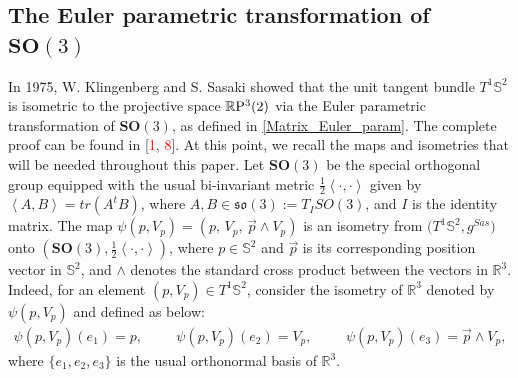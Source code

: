\documentclass[reqno,11pt]{amsart}
\begin{document}




\subsection{The Euler parametric transformation of $\mathbf{SO}(3)$}\label{subsec:Euler}
In 1975, W. Klingenberg and S. Sasaki showed that the unit tangent bundle $T^1\mathbb{S}^2$ is isometric to the projective space $\mathbb{R}\rm{P}^3(2)$ via the Euler parametric transformation of $\mathbf{SO}(3)$, as defined in \eqref{Matrix_Euler_param}. The complete proof can be found in [\textcolor{red}{1}, \textcolor{red}{8}].
At this point, we recall the maps and isometries that will be needed throughout this paper. Let $\mathbf{SO}(3)$ be the special orthogonal group equipped with the usual bi-invariant metric $\frac{1}{2}\left\langle\cdot ,\cdot \right\rangle$ given by
$\left\langle A,B \right\rangle = tr(A^{t}B)$,
where $A,B \in \mathfrak{so}(3):= T_I SO(3)$, and $I$ is the identity matrix. 
The map $\psi(p, V_p) = \left(p,\,V_p, \, \vec{p} \wedge V_p\right)$ is an isometry from $\big(T^1\mathbb{S}^2, g^{Sas}\big)$ onto $\left(\mathbf{SO}(3), \frac{1}{2}\left\langle\cdot ,\cdot \right\rangle\right)$, where $p \in \mathbb{S}^2$ and $\vec{p}$ is its corresponding position vector in $\mathbb{S}^2$, and $\wedge$ denotes the standard cross product between the vectors in $\mathbb{R}^3$. Indeed, for an element $(p,V_p) \in T^1\mathbb{S}^2$, consider the isometry of $\mathbb{R}^3$ denoted by $\psi(p,V_p)$ and defined as below:
\begin{align*}
    \psi(p,V_p)(e_1) = p, \hspace{1cm} \psi(p,V_p)(e_2) = V_p, \hspace{1cm} \psi(p,V_p)(e_3) = \vec{p}\wedge V_p,
\end{align*}
where $\{ e_1, e_2, e_3 \}$ is the usual orthonormal basis of $\mathbb{R}^3$.
\end{document}
